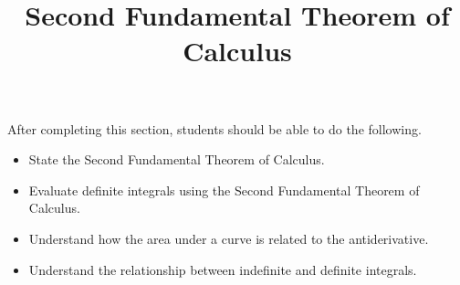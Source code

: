 \documentclass{ximera}
\title{Second Fundamental Theorem of Calculus}
\begin{document}
\begin{abstract}
\end{abstract}

\maketitle

\begin{sectionOutcomes}

After completing this section, students should be able to do the following.

\begin{itemize}
	\item State the Second Fundamental Theorem of Calculus.
	\item Evaluate definite integrals using the Second Fundamental Theorem of Calculus.
	\item Understand how the area under a curve is related to the antiderivative.
	\item Understand the relationship between indefinite and definite integrals.
\end{itemize}

\end{sectionOutcomes}
\end{document}
